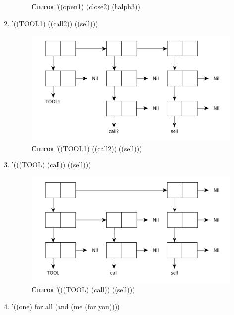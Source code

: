 \begin{enumerate}
\begin{figure}[H]
            \caption{Список '((open1) (close2) (halph3))}
        \end{figure}
    \item '((TOOL1) ((call2)) ((sell)))
        \begin{figure}[H]
            \centering
            \includegraphics[scale=0.60]{data/pdf/01-04.pdf}
            \caption{Список '((TOOL1) ((call2)) ((sell)))}
        \end{figure}
    \item '(((TOOL) (call)) ((sell)))
        \begin{figure}[H]
            \centering
            \includegraphics[scale=0.60]{data/pdf/01-05.pdf}
            \caption{Список '(((TOOL) (call)) ((sell)))}
        \end{figure}
    \item '((one) for all (and (me (for you))))
        \begin{figure}[H]
            \centering

\end{figure}
\end{enumerate}
